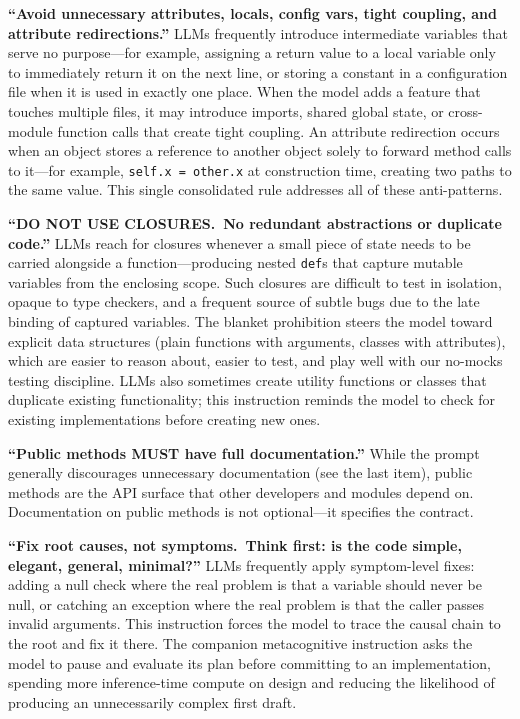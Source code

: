 \documentclass{article}
\begin{document}
\textbf{``Avoid unnecessary attributes, locals, config vars, tight coupling, and attribute redirections.''}  LLMs frequently introduce intermediate variables that serve no purpose---for example, assigning a return value to a local variable only to immediately return it on the next line, or storing a constant in a configuration file when it is used in exactly one place.  When the model adds a feature that touches multiple files, it may introduce imports, shared global state, or cross-module function calls that create tight coupling.  An attribute redirection occurs when an object stores a reference to another object solely to forward method calls to it---for example, \texttt{self.x = other.x} at construction time, creating two paths to the same value.  This single consolidated rule addresses all of these anti-patterns.

\textbf{``DO NOT USE CLOSURES.\ No redundant abstractions or duplicate code.''}  LLMs reach for closures whenever a small piece of state needs to be carried alongside a function---producing nested \texttt{def}s that capture mutable variables from the enclosing scope.  Such closures are difficult to test in isolation, opaque to type checkers, and a frequent source of subtle bugs due to the late binding of captured variables.  The blanket prohibition steers the model toward explicit data structures (plain functions with arguments, classes with attributes), which are easier to reason about, easier to test, and play well with our no-mocks testing discipline.  LLMs also sometimes create utility functions or classes that duplicate existing functionality; this instruction reminds the model to check for existing implementations before creating new ones.

\textbf{``Public methods MUST have full documentation.''}  While the prompt generally discourages unnecessary documentation (see the last item), public methods are the API surface that other developers and modules depend on.  Documentation on public methods is not optional---it specifies the contract.

\textbf{``Fix root causes, not symptoms.\ Think first: is the code simple, elegant, general, minimal?''}  LLMs frequently apply symptom-level fixes: adding a null check where the real problem is that a variable should never be null, or catching an exception where the real problem is that the caller passes invalid arguments.  This instruction forces the model to trace the causal chain to the root and fix it there.  The companion metacognitive instruction asks the model to pause and evaluate its plan before committing to an implementation, spending more inference-time compute on design and reducing the likelihood of producing an unnecessarily complex first draft.
\end{document}
